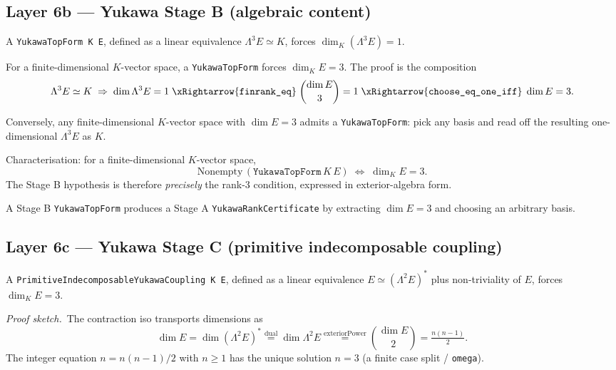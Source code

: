 \subsection*{Layer 6b --- Yukawa Stage B (algebraic content)}

\begin{theorem}
A \texttt{YukawaTopForm K E}, defined as a linear equivalence
$\Lambda^3 E \simeq K$, forces $\dim_K (\Lambda^3 E) = 1$.
\end{theorem}

\begin{theorem}
For a finite-dimensional $K$-vector space, a \texttt{YukawaTopForm}
forces $\dim_K E = 3$. The proof is the composition
\[
\Lambda^3 E \simeq K
\;\Rightarrow\; \dim \Lambda^3 E = 1
\;\xRightarrow{\text{\texttt{finrank\_eq}}}\; \binom{\dim E}{3} = 1
\;\xRightarrow{\text{\texttt{choose\_eq\_one\_iff}}}\; \dim E = 3.
\]
\end{theorem}

\begin{theorem}
Conversely, any finite-dimensional $K$-vector space with $\dim E = 3$
admits a \texttt{YukawaTopForm}: pick any basis and read off the
resulting one-dimensional $\Lambda^3 E$ as $K$.
\end{theorem}

\begin{theorem}
Characterisation: for a finite-dimensional $K$-vector space,
\[
\text{Nonempty}\,(\texttt{YukawaTopForm}\,K\,E)
\;\iff\;
\dim_K E = 3.
\]
The Stage B hypothesis is therefore \emph{precisely} the rank-3
condition, expressed in exterior-algebra form.
\end{theorem}

\begin{theorem}
A Stage B \texttt{YukawaTopForm} produces a Stage A
\texttt{YukawaRankCertificate} by extracting $\dim E = 3$ and
choosing an arbitrary basis.
\end{theorem}

\subsection*{Layer 6c --- Yukawa Stage C (primitive indecomposable
coupling)}

\begin{theorem}
A \texttt{PrimitiveIndecomposableYukawaCoupling K E}, defined as
a linear equivalence $E \simeq (\Lambda^2 E)^*$ plus
non-triviality of $E$, forces $\dim_K E = 3$.

\smallskip\noindent
\emph{Proof sketch.}\ The contraction iso transports dimensions
as
\[
\dim E
  = \dim (\Lambda^2 E)^*
  \overset{\text{dual}}{=} \dim \Lambda^2 E
  \overset{\text{exteriorPower}}{=} \binom{\dim E}{2}
  = \tfrac{n(n-1)}{2}.
\]
The integer equation $n = n(n-1)/2$ with $n \ge 1$ has the
unique solution $n = 3$ (a finite case split / \texttt{omega}).
\end{theorem}

